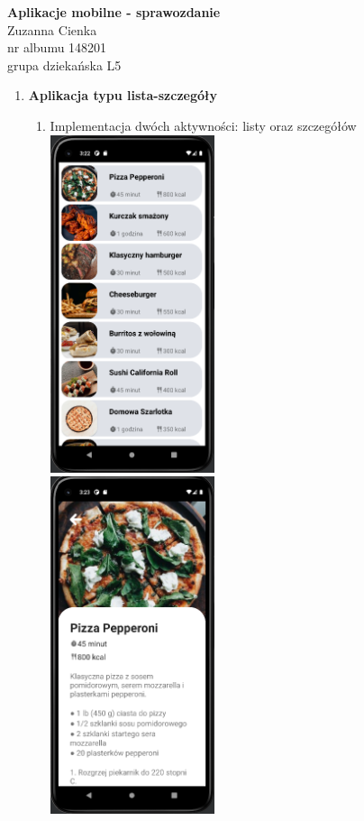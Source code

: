 \documentclass{article}
\begin{document}
\begin{center}\vspace{-1cm}
    \textbf{ \Huge Aplikacje mobilne - sprawozdanie}\\
    \LARGE Zuzanna Cienka \\
    \large nr albumu 148201\\
    \large grupa dziekańska L5 \\
\end{center}

\begin{enumerate}
    \item \textbf{Aplikacja typu lista-szczegóły}
          \begin{enumerate}
              \item Implementacja dwóch aktywności: listy oraz szczegółów \\
              \includegraphics[width=0.4\textwidth]{"imgs/phone_list.png"} \\
              \includegraphics[width=0.4\textwidth]{"imgs/phone_recipe_detail.png"} \\

\end{enumerate}
\end{enumerate}
\end{document}
